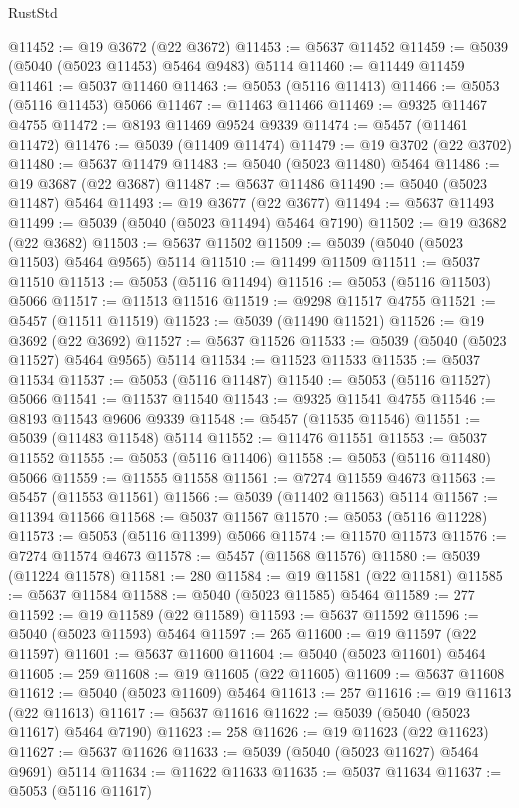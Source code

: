 \begin{lexlean}{RustStd}
\begin{coremodule}
@11452 := @19 @3672 (@22 @3672)
@11453 := @5637 @11452
@11459 := @5039 (@5040 (@5023 @11453) @5464 @9483) @5114
@11460 := @11449 @11459
@11461 := @5037 @11460
@11463 := @5053 (@5116 @11413)
@11466 := @5053 (@5116 @11453) @5066
@11467 := @11463 @11466
@11469 := @9325 @11467 @4755
@11472 := @8193 @11469 @9524 @9339
@11474 := @5457 (@11461 @11472)
@11476 := @5039 (@11409 @11474)
@11479 := @19 @3702 (@22 @3702)
@11480 := @5637 @11479
@11483 := @5040 (@5023 @11480) @5464
@11486 := @19 @3687 (@22 @3687)
@11487 := @5637 @11486
@11490 := @5040 (@5023 @11487) @5464
@11493 := @19 @3677 (@22 @3677)
@11494 := @5637 @11493
@11499 := @5039 (@5040 (@5023 @11494) @5464 @7190)
@11502 := @19 @3682 (@22 @3682)
@11503 := @5637 @11502
@11509 := @5039 (@5040 (@5023 @11503) @5464 @9565) @5114
@11510 := @11499 @11509
@11511 := @5037 @11510
@11513 := @5053 (@5116 @11494)
@11516 := @5053 (@5116 @11503) @5066
@11517 := @11513 @11516
@11519 := @9298 @11517 @4755
@11521 := @5457 (@11511 @11519)
@11523 := @5039 (@11490 @11521)
@11526 := @19 @3692 (@22 @3692)
@11527 := @5637 @11526
@11533 := @5039 (@5040 (@5023 @11527) @5464 @9565) @5114
@11534 := @11523 @11533
@11535 := @5037 @11534
@11537 := @5053 (@5116 @11487)
@11540 := @5053 (@5116 @11527) @5066
@11541 := @11537 @11540
@11543 := @9325 @11541 @4755
@11546 := @8193 @11543 @9606 @9339
@11548 := @5457 (@11535 @11546)
@11551 := @5039 (@11483 @11548) @5114
@11552 := @11476 @11551
@11553 := @5037 @11552
@11555 := @5053 (@5116 @11406)
@11558 := @5053 (@5116 @11480) @5066
@11559 := @11555 @11558
@11561 := @7274 @11559 @4673
@11563 := @5457 (@11553 @11561)
@11566 := @5039 (@11402 @11563) @5114
@11567 := @11394 @11566
@11568 := @5037 @11567
@11570 := @5053 (@5116 @11228)
@11573 := @5053 (@5116 @11399) @5066
@11574 := @11570 @11573
@11576 := @7274 @11574 @4673
@11578 := @5457 (@11568 @11576)
@11580 := @5039 (@11224 @11578)
@11581 := 280
@11584 := @19 @11581 (@22 @11581)
@11585 := @5637 @11584
@11588 := @5040 (@5023 @11585) @5464
@11589 := 277
@11592 := @19 @11589 (@22 @11589)
@11593 := @5637 @11592
@11596 := @5040 (@5023 @11593) @5464
@11597 := 265
@11600 := @19 @11597 (@22 @11597)
@11601 := @5637 @11600
@11604 := @5040 (@5023 @11601) @5464
@11605 := 259
@11608 := @19 @11605 (@22 @11605)
@11609 := @5637 @11608
@11612 := @5040 (@5023 @11609) @5464
@11613 := 257
@11616 := @19 @11613 (@22 @11613)
@11617 := @5637 @11616
@11622 := @5039 (@5040 (@5023 @11617) @5464 @7190)
@11623 := 258
@11626 := @19 @11623 (@22 @11623)
@11627 := @5637 @11626
@11633 := @5039 (@5040 (@5023 @11627) @5464 @9691) @5114
@11634 := @11622 @11633
@11635 := @5037 @11634
@11637 := @5053 (@5116 @11617)

\end{coremodule}
\end{lexlean}
